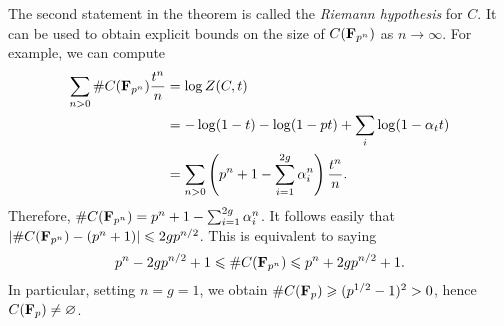 The second statement in the theorem is called the \emph{Riemann hypothesis} 
for $C$. It can be used to obtain explicit bounds on the size of 
$C(\mathbf{F}_{p^n})$ as $n\to\infty$. For example, we can compute 
\begin{align*}
  \sum_{n>0} \# C(\mathbf{F}_{p^n}) \frac{t^n}{n} 
    &= \log Z(C,t) \\
    &= -\log(1-t) - \log(1-p t) + \sum_i \log(1-\alpha_t t) \\
    &= \sum_{n>0} \left(p^n+1-\sum_{i=1}^{2 g} \alpha_i^n\right) \frac{t^n}{n} \text{.}
\end{align*}
Therefore, $\# C(\mathbf{F}_{p^n}) = p^n+1-\sum_{i=1}^{2 g} \alpha_i^n$. It 
follows easily that $|\# C(\mathbf{F}_{p^n})-(p^n+1)| \leqslant 2 g p^{n/2}$. 
This is equivalent to saying 
\[
  p^n-2 g p^{n/2}+1 
    \leqslant \# C(\mathbf{F}_{p^n}) 
    \leqslant p^n + 2 g p^{n/2} + 1 \text{.}
\]
In particular, setting $n = g = 1$, we obtain 
$\# C(\mathbf{F}_p) \geqslant (p^{1/2}-1)^2>0$, hence 
$C(\mathbf{F}_p)\ne\varnothing$. 




